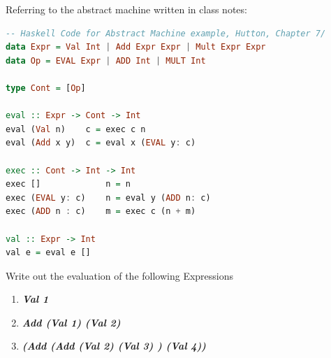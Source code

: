 \documentclass{article}
\begin{document}
\begin{exercise}
Referring to the abstract machine written in class notes:
\begin{lstlisting}[language=Haskell]
-- Haskell Code for Abstract Machine example, Hutton, Chapter 7/
data Expr = Val Int | Add Expr Expr | Mult Expr Expr
data Op = EVAL Expr | ADD Int | MULT Int

type Cont = [Op]

eval :: Expr -> Cont -> Int
eval (Val n)    c = exec c n
eval (Add x y)  c = eval x (EVAL y: c)

exec :: Cont -> Int -> Int 
exec []             n = n
exec (EVAL y: c)    n = eval y (ADD n: c)
exec (ADD n : c)    m = exec c (n + m)

val :: Expr -> Int
val e = eval e [] 
\end{lstlisting}
Write out the evaluation of the following Expressions

\begin{enumerate}
  \item
   \textbf{\textit{Val 1}}
 
  \item

    \textbf{\textit{Add (Val 1) (Val 2) }} 

  \item

   \textbf{\textit{(Add (Add (Val 2) (Val 3) ) (Val 4))}}

\end{enumerate}
\end{exercise}
\end{document}
